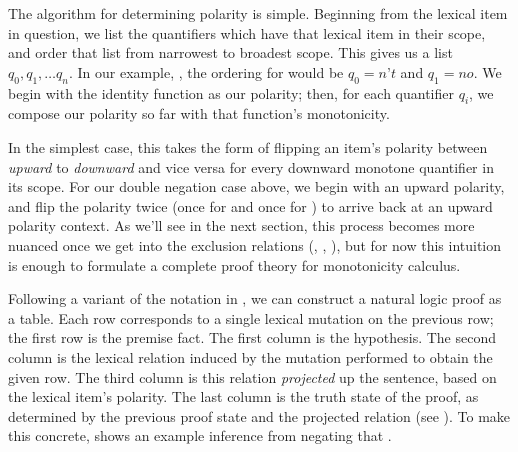 The algorithm for determining polarity is simple.
Beginning from the lexical item in question, we list the quantifiers which have that lexical item
  in their scope, and order that list from narrowest to broadest scope.
This gives us a list $q_0, q_1, \dots q_n$.
In our example, , the ordering for  would be
  $q_0=\textit{n't}$ and $q_1=\textit{no}$.
We begin with the identity function as our polarity;
  then, for each quantifier $q_i$, we compose our polarity so far with
  that function's monotonicity.

In the simplest case, this takes the form of flipping an item's polarity between \textit{upward}
  to \textit{downward} and vice versa for every downward monotone quantifier in its scope.
For our double negation case above, we begin with an upward polarity, and flip the polarity twice
  (once for  and once for ) to arrive back at an upward polarity context.
As we'll see in the next section, this process becomes more nuanced once we get into the exclusion
  relations (\alternate, \negate, \cover), but for now this intuition is enough to formulate
  a complete proof theory for monotonicity calculus.

Following a variant of the notation in , we can 
  construct a natural logic proof as a table.
Each row corresponds to a single lexical mutation on the previous row; the first row is the
  premise fact.
The first column is the hypothesis.
The second column is the lexical relation induced by the mutation performed to obtain the given
  row.
The third column is this relation \textit{projected} up the sentence, based on the lexical item's
  polarity.
The last column is the truth state of the proof, as determined by the previous proof state and the
  projected relation (see ).
To make this concrete,  shows an example inference
  from  negating that .

